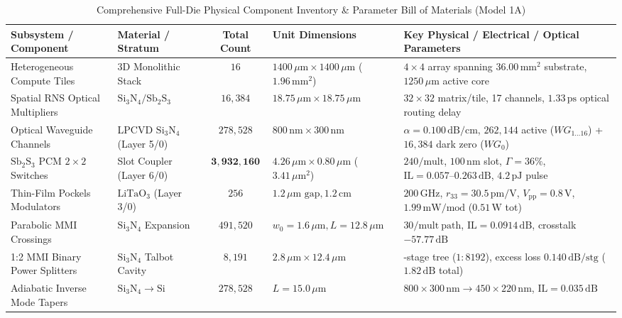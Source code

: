 \documentclass[journal]{IEEEtran}
\begin{document}
\begin{table}[!htbp]
\centering
\caption{Comprehensive Full-Die Physical Component Inventory \& Parameter Bill of Materials (Model 1A)}
\label{tab:component_bom}
\footnotesize
\setlength{\tabcolsep}{3pt}
\begin{tabularx}{\textwidth}{l l c l >{\raggedright\arraybackslash}X}
\toprule
\textbf{Subsystem / Component} & \textbf{Material / Stratum} & \textbf{Total Count} & \textbf{Unit Dimensions} & \textbf{Key Physical / Electrical / Optical Parameters} \\
\midrule
Heterogeneous Compute Tiles & 3D Monolithic Stack & $16$ & $1400\,\mu\mathrm{m} \times 1400\,\mu\mathrm{m}$ ($1.96\,\mathrm{mm^2}$) & $4 \times 4$ array spanning $36.00\,\mathrm{mm^2}$ substrate, $1250\,\mu\mathrm{m}$ active core \\
Spatial RNS Optical Multipliers & $\mathrm{Si_3N_4} / \mathrm{Sb_2S_3}$ & $16,384$ & $18.75\,\mu\mathrm{m} \times 18.75\,\mu\mathrm{m}$ & $32 \times 32$ matrix/tile, 17 channels, $1.33\,\mathrm{ps}$ optical routing delay \\
Optical Waveguide Channels & LPCVD $\mathrm{Si_3N_4}$ (Layer 5/0) & $278,528$ & $800\,\mathrm{nm} \times 300\,\mathrm{nm}$ & $\alpha = 0.100\,\mathrm{dB/cm}$, $262,144$ active ($WG_{1\dots16}$) + $16,384$ dark zero ($WG_0$) \\
$\mathrm{Sb_2S_3}$ PCM $2\times2$ Switches & Slot Coupler (Layer 6/0) & $\mathbf{3,932,160}$ & $4.26\,\mu\mathrm{m} \times 0.80\,\mu\mathrm{m}$ ($3.41\,\mu\mathrm{m^2}$) & $240/\mathrm{mult}$, $100\,\mathrm{nm}$ slot, $\Gamma = 36\%$, $\mathrm{IL} = 0.057\text{--}0.263\,\mathrm{dB}$, $4.2\,\mathrm{pJ}$ pulse \\
Thin-Film Pockels Modulators & $\mathrm{LiTaO_3}$ (Layer 3/0) & $256$ & $1.2\,\mu\mathrm{m}\text{ gap}, 1.2\,\mathrm{cm}$ & $200\,\mathrm{GHz}$, $r_{33} = 30.5\,\mathrm{pm/V}$, $V_{\mathrm{pp}} = 0.8\,\mathrm{V}$, $1.99\,\mathrm{mW/mod}$ ($0.51\,\mathrm{W}$ tot) \\
Parabolic MMI Crossings & $\mathrm{Si_3N_4}$ Expansion & $491,520$ & $w_0 = 1.6\,\mu\mathrm{m}, L=12.8\,\mu\mathrm{m}$ & $30/\mathrm{mult\ path}$, $\mathrm{IL} = 0.0914\,\mathrm{dB}$, crosstalk $-57.77\,\mathrm{dB}$ \\
1:2 MMI Binary Power Splitters & $\mathrm{Si_3N_4}$ Talbot Cavity & $8,191$ & $2.8\,\mu\mathrm{m} \times 12.4\,\mu\mathrm{m}$ & 13-stage tree ($1:8192$), excess loss $0.140\,\mathrm{dB/stg}$ ($1.82\,\mathrm{dB}$ total) \\
Adiabatic Inverse Mode Tapers & $\mathrm{Si_3N_4} \to \mathrm{Si}$ & $278,528$ & $L = 15.0\,\mu\mathrm{m}$ & $800\times300\,\mathrm{nm} \to 450\times220\,\mathrm{nm}$, $\mathrm{IL} = 0.035\,\mathrm{dB}$ \\

\end{tabularx}
\end{table}
\end{document}
